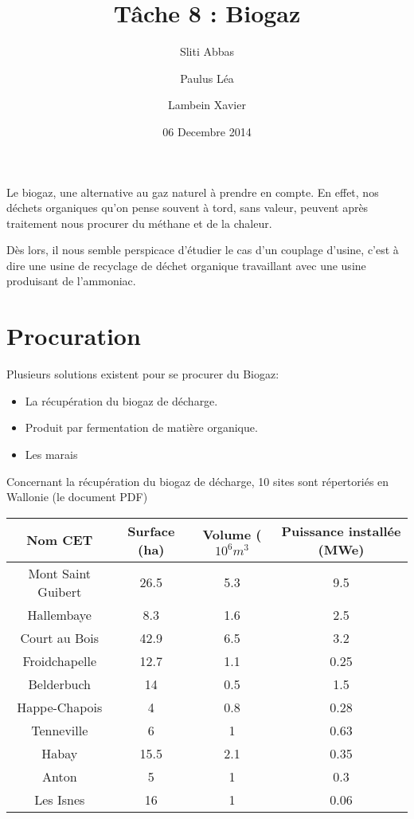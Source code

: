 \documentclass[10pt,a4paper]{article}
\title{Tâche 8 : Biogaz}
\author{Sliti Abbas\and Paulus Léa\and Lambein Xavier}
\date{06 Decembre 2014}
\begin{document}
\maketitle
Le biogaz, une alternative au gaz naturel à prendre en compte. En effet, nos déchets organiques qu'on pense souvent à tord, sans valeur, peuvent après traitement nous procurer du méthane et de la chaleur.

Dès lors, il nous semble perspicace d'étudier le cas d'un couplage d'usine, c'est à dire une usine de recyclage de déchet organique travaillant avec une usine produisant de l'ammoniac.

\section{Procuration}
Plusieurs solutions existent pour se procurer du Biogaz:
\begin{itemize}
\item La récupération du biogaz de décharge.
\item Produit par fermentation de matière organique.
\item Les marais
\end{itemize}

Concernant la récupération du biogaz de décharge, 10 sites sont répertoriés en Wallonie (le document PDF)
\begin{center}
\begin{tabular}{|c|c|c|c|}
\hline 
Nom CET & Surface (ha) & Volume ($\unit{10^6}{m^3}$ & Puissance installée (MWe) \\ 
\hline 
Mont Saint Guibert & 26.5 & 5.3 & 9.5 \\ 
\hline 
Hallembaye & 8.3 & 1.6 & 2.5 \\ 
\hline 
Court au Bois & 42.9 & 6.5 & 3.2 \\ 
\hline 
Froidchapelle & 12.7 & 1.1& 0.25 \\ 
\hline 
Belderbuch & 14 & 0.5 & 1.5 \\ 
\hline 
Happe-Chapois & 4 & 0.8 & 0.28 \\ 
\hline 
Tenneville & 6 & 1 & 0.63 \\ 
\hline 
Habay & 15.5 & 2.1 & 0.35 \\ 
\hline 
Anton & 5 & 1 & 0.3 \\ 
\hline 
Les Isnes & 16 & 1 & 0.06 \\ 
\hline 
\end{tabular} 
\end{center}
\end{document}
